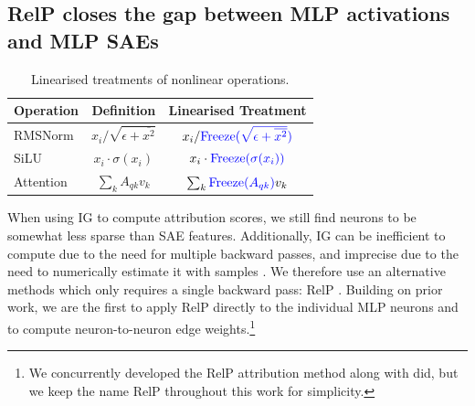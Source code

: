 \documentclass{article}
\theoremstyle{plain}
\theoremstyle{definition}
\theoremstyle{remark}
\begin{document}
\subsection{RelP closes the gap between MLP activations and MLP SAEs}

\begin{table}[!t]
\small
\centering
\caption{Linearised treatments of nonlinear operations.}
\begin{tabular}{lcc}
\toprule
\textbf{Operation} & \textbf{Definition} & \textbf{Linearised Treatment} \\
\midrule
RMSNorm & $x_i / \sqrt{\epsilon + \overline{x^2}}$ & $x_i / {\color{blue}\mathrm{Freeze}(\sqrt{\epsilon + \overline{x^2}})}$ \\
\addlinespace
SiLU & $x_i \cdot \sigma(x_i)$ & $x_i \cdot {\color{blue}\mathrm{Freeze}(\sigma(x_i))}$ \\
\addlinespace
Attention & $\sum_k A_{qk} v_k$ & $\sum_k {\color{blue}\mathrm{Freeze}(A_{qk})} v_k$ \\
\bottomrule
\end{tabular}
\label{tab:linearised_ops}
\end{table}

When using IG to compute attribution scores, we still find neurons to be somewhat less sparse than SAE features. Additionally, IG can be inefficient to compute due to the need for multiple backward passes, and imprecise due to the need to numerically estimate it with samples \citep{makino2024impact}. We therefore use an alternative methods which only requires a single backward pass: RelP \citep{jafari2025relp}. Building on prior work, we are the first to apply RelP directly to the individual MLP neurons and to compute neuron-to-neuron edge weights.\footnote{We concurrently developed the RelP attribution method along with \citet{jafari2025relp} did, but we keep the name RelP throughout this work for simplicity.}

\end{document}
